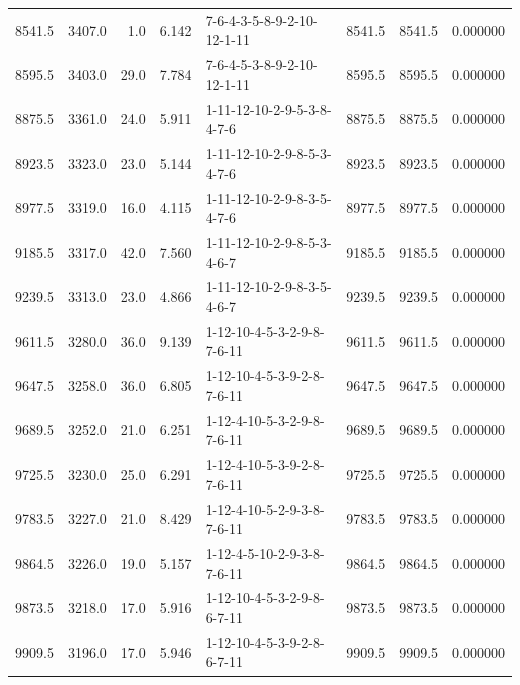 \begin{tabular}{rrrrlrrr}
  8541.5 &  3407.0 &            1.0 &              6.142 &  7-6-4-3-5-8-9-2-10-12-1-11 &        8541.5 &          8541.5 &  0.000000 \\
  8595.5 &  3403.0 &           29.0 &              7.784 &  7-6-4-5-3-8-9-2-10-12-1-11 &        8595.5 &          8595.5 &  0.000000 \\
  8875.5 &  3361.0 &           24.0 &              5.911 &  1-11-12-10-2-9-5-3-8-4-7-6 &        8875.5 &          8875.5 &  0.000000 \\
  8923.5 &  3323.0 &           23.0 &              5.144 &  1-11-12-10-2-9-8-5-3-4-7-6 &        8923.5 &          8923.5 &  0.000000 \\
  8977.5 &  3319.0 &           16.0 &              4.115 &  1-11-12-10-2-9-8-3-5-4-7-6 &        8977.5 &          8977.5 &  0.000000 \\
  9185.5 &  3317.0 &           42.0 &              7.560 &  1-11-12-10-2-9-8-5-3-4-6-7 &        9185.5 &          9185.5 &  0.000000 \\
  9239.5 &  3313.0 &           23.0 &              4.866 &  1-11-12-10-2-9-8-3-5-4-6-7 &        9239.5 &          9239.5 &  0.000000 \\
  9611.5 &  3280.0 &           36.0 &              9.139 &  1-12-10-4-5-3-2-9-8-7-6-11 &        9611.5 &          9611.5 &  0.000000 \\
  9647.5 &  3258.0 &           36.0 &              6.805 &  1-12-10-4-5-3-9-2-8-7-6-11 &        9647.5 &          9647.5 &  0.000000 \\
  9689.5 &  3252.0 &           21.0 &              6.251 &  1-12-4-10-5-3-2-9-8-7-6-11 &        9689.5 &          9689.5 &  0.000000 \\
  9725.5 &  3230.0 &           25.0 &              6.291 &  1-12-4-10-5-3-9-2-8-7-6-11 &        9725.5 &          9725.5 &  0.000000 \\
  9783.5 &  3227.0 &           21.0 &              8.429 &  1-12-4-10-5-2-9-3-8-7-6-11 &        9783.5 &          9783.5 &  0.000000 \\
  9864.5 &  3226.0 &           19.0 &              5.157 &  1-12-4-5-10-2-9-3-8-7-6-11 &        9864.5 &          9864.5 &  0.000000 \\
  9873.5 &  3218.0 &           17.0 &              5.916 &  1-12-10-4-5-3-2-9-8-6-7-11 &        9873.5 &          9873.5 &  0.000000 \\
  9909.5 &  3196.0 &           17.0 &              5.946 &  1-12-10-4-5-3-9-2-8-6-7-11 &        9909.5 &          9909.5 &  0.000000 \\

\end{tabular}
